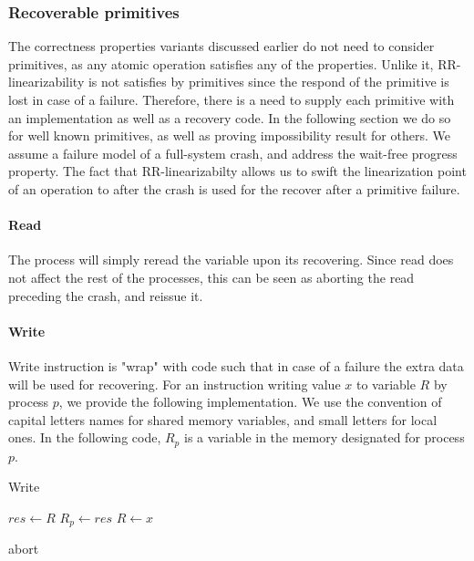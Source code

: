 \documentclass{article}
\begin{document}
\subsubsection*{Recoverable primitives}

The correctness properties variants discussed earlier do not need to consider primitives, as any atomic operation satisfies any of the properties. Unlike it, RR-linearizability is not satisfies by primitives since the respond of the primitive is lost in case of a failure. Therefore, there is a need to supply each primitive with an implementation as well as a recovery code. In the following section we do so for well known primitives, as well as proving impossibility result for others. We assume a failure model of a full-system crash, and address the wait-free progress property.
The fact that RR-linearizabilty allows us to swift the linearization point of an operation to after the crash is used for the recover after a primitive failure.

\paragraph*{Read}

The process will simply reread the variable upon its recovering. Since read does not affect the rest of the processes, this can be seen as aborting the read preceding the crash, and reissue it.

\paragraph*{Write}
Write instruction is "wrap" with code such that in case of a failure the extra data will be used for recovering. For an instruction writing value $x$ to variable $R$ by process $p$, we provide the following implementation. We use the convention of capital letters names for shared memory variables, and small letters for local ones. In the following code, $R_p$ is a variable in the memory designated for process $p$.

\begin{algorithm}
	\caption{Write}\label{euclid}
	\begin{algorithmic}[1]
		\State $res \gets R$
		\State $R_{p} \gets res$
		\State $R \gets x$
		\EndProcedure
		
		 \Return abort
		\EndIf
		\EndProcedure
	\end{algorithmic}
\end{algorithm}
\end{document}
